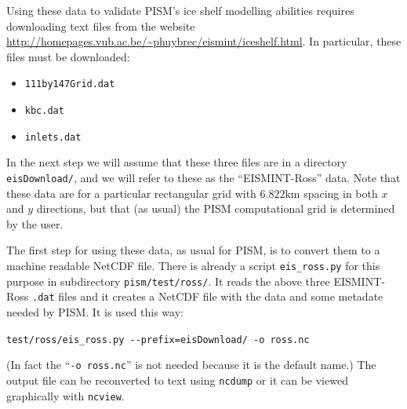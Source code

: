 \documentclass[11pt,final]{amsart}
\begin{document}
Using these data to validate PISM's ice shelf modelling abilities requires downloading text files from the website \url{http://homepages.vub.ac.be/~phuybrec/eismint/iceshelf.html}.  In particular, these files must be downloaded:
\begin{itemize}
\item \verb|111by147Grid.dat|
\item \verb|kbc.dat|
\item \verb|inlets.dat|
\end{itemize}
In the next step we will assume that these three files are in a directory \verb|eisDownload/|, and we will refer to these as the ``EISMINT-Ross'' data.  Note that these data are for a particular rectangular grid with $6.822$km spacing in both $x$ and $y$ directions, but that (as usual) the PISM computational grid is determined by the user.

The first step for using these data, as usual for PISM, is to convert them to a machine readable NetCDF file.  There is already a script \verb|eis_ross.py| for this purpose in subdirectory \verb|pism/test/ross/|.  It  reads the above three EISMINT-Ross \verb|.dat| files and it creates a NetCDF file with the data and some metadate needed by PISM.  It is used this way:

\verb|test/ross/eis_ross.py --prefix=eisDownload/ -o ross.nc|

\noindent (In fact the ``\verb|-o ross.nc|'' is not needed because it is the default name.)  The output file can be reconverted to text using \verb|ncdump| or it can be viewed graphically with \verb|ncview|.
\end{document}
